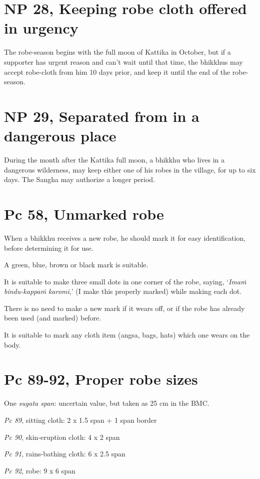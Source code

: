 \section{NP 28, Keeping robe cloth offered in urgency}

The robe-season begins with the full moon of Kattika in October, but if
a supporter has urgent reason and can't wait until that time, the
bhikkhus may accept robe-cloth from him 10 days prior, and keep it until
the end of the robe-season.

\section{NP 29, Separated from in a dangerous place}

During the month after the Kattika full moon, a bhikkhu who lives in a
dangerous wilderness, may keep either one of his robes in the village,
for up to six days. The Sangha may authorize a longer period.

\section{Pc 58, Unmarked robe}

When a bhikkhu receives a new robe, he should mark it for easy
identification, before determining it for use.

A green, blue, brown or black mark is suitable.

It is suitable to make three small dots in one corner of the robe,
saying, `\emph{Imaṁ bindu-kappaṁ karomi},' (I make this properly marked)
while making each dot.

There is no need to make a new mark if it wears off, or if the robe has
already been used (and marked) before.

It is suitable to mark any cloth item (angsa, bags, hats) which one
wears on the body.

\section{Pc 89-92, Proper robe sizes}

One \emph{sugata span}: uncertain value, but taken as 25 cm in the BMC.

\emph{Pc 89}, sitting cloth: 2 x 1.5 span + 1 span border

\emph{Pc 90}, skin-eruption cloth: 4 x 2 span

\emph{Pc 91}, rains-bathing cloth: 6 x 2.5 span

\emph{Pc 92}, robe: 9 x 6 span

